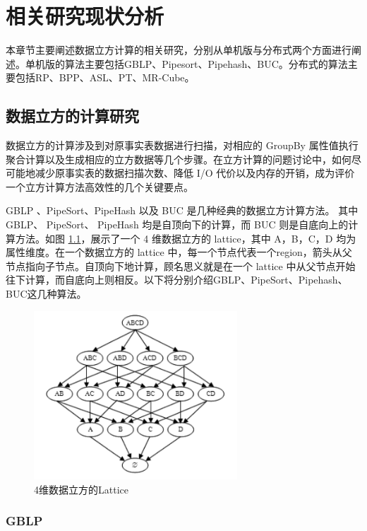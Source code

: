 \chapter{相关研究现状分析}

本章节主要阐述数据立方计算的相关研究，分别从单机版与分布式两个方面进行阐述。单机版的算法主要包括GBLP、Pipesort、Pipehash、BUC。分布式的算法主要包括RP、BPP、ASL、PT、MR-Cube。

\section{数据立方的计算研究}

数据立方的计算涉及到对原事实表数据进行扫描，对相应的 GroupBy 属性值执行聚合计算以及生成相应的立方数据等几个步骤。在立方计算的问题讨论中，如何尽可能地减少原事实表的数据扫描次数、降低 I/O 代价以及内存的开销，成为评价一个立方计算方法高效性的几个关键要点。

GBLP \cite{gray1997data}、PipeSort、PipeHash \cite{agarwal1996computation} 以及 BUC \cite{beyer1999bottom} 是几种经典的数据立方计算方法。 其中GBLP、 PipeSort、 PipeHash 均是自顶向下的计算，而 BUC 则是自底向上的计算方法。如图 \ref{4_dimension_lattice}，展示了一个 4 维数据立方的 lattice，其中 A，B，C，D 均为属性维度。在一个数据立方的 lattice 中，每一个节点代表一个region，箭头从父节点指向子节点。自顶向下地计算，顾名思义就是在一个 lattice 中从父节点开始往下计算，而自底向上则相反。以下将分别介绍GBLP、PipeSort、Pipehash、BUC这几种算法。


\begin{figure}[!htb]
\centering\includegraphics[width=3in]{picture/ch_current_research/4_dimension_lattice} 
\caption{4维数据立方的Lattice}\label{4_dimension_lattice} 
\end{figure} 

\subsection{GBLP}

